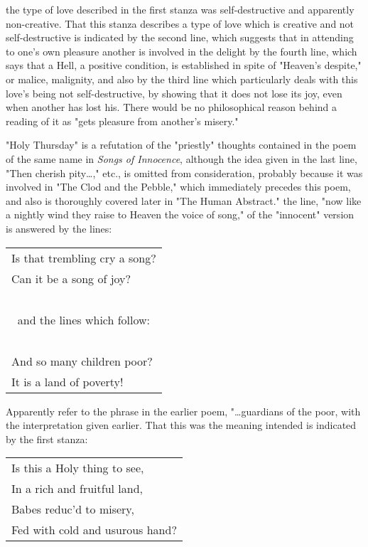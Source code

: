 \noindent the type of love described in the first stanza was self-destructive and apparently non-creative. That this stanza
describes a type of love which is creative and not self-destructive is indicated by the second line, which suggests
that in attending to one's own pleasure another is involved in the delight by the fourth line, which says that
a Hell, a positive condition, is established in spite of "Heaven's despite," or malice, malignity, and also
by the third line which particularly deals with this love's being not self-destructive, by showing that it does
not lose its joy, even when another has lost his. There would be no philosophical reason behind a reading of it as "gets 
pleasure from another's misery."\par
\vspace*{0.5\baselineskip}
"Holy Thursday" is a refutation of the "priestly" thoughts contained in the poem of the 
same name in \textit{Songs of Innocence}, although the idea given in the last line, "Then cherish pity\dots," etc., is omitted from consideration,
probably because it was involved in "The Clod and the Pebble," which immediately precedes this poem, and also is thoroughly
covered later in "The Human Abstract." the line, "now like a nightly wind they raise to Heaven the voice of song," of the "innocent"
version is answered by the lines:\par
\begin{center}
	\begin{tabular}{l}
		Is that trembling cry a song?                   \\
		Can it be a song of joy?                        \\
		~                                               \\
		\multicolumn{1}{c}{and the lines which follow:} \\
		~                                               \\
		And so many children poor?                      \\
		It is a land of poverty!
	\end{tabular}
\end{center}
\hspace*{5mm}Apparently refer to the phrase in the earlier poem, "\dots guardians of the poor,
with the interpretation given earlier. That this was the meaning intended is indicated by the 
first stanza:\par
\begin{center}
	\begin{tabular}{l}
		Is this a Holy thing to see, \\
		In a rich and fruitful land, \\
		Babes reduc'd to misery,     \\
		Fed with cold and usurous hand?
	\end{tabular}
\end{center}
